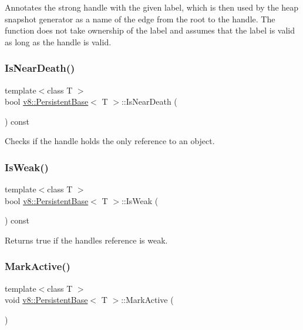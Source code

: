 Annotates the strong handle with the given label, which is then used by the heap snapshot generator as a name of the edge from the root to the handle. The function does not take ownership of the label and assumes that the label is valid as long as the handle is valid. \mbox{\label{classv8_1_1PersistentBase_a6587b66b7d4c0397129c51d0507b4094}} 
\subsubsection{\texorpdfstring{Is\+Near\+Death()}{IsNearDeath()}}
{\footnotesize\ttfamily template$<$class T $>$ \\
bool \mbox{\hyperlink{classv8_1_1PersistentBase}{v8\+::\+Persistent\+Base}}$<$ T $>$\+::Is\+Near\+Death (\begin{DoxyParamCaption}{ }\end{DoxyParamCaption}) const}

Checks if the handle holds the only reference to an object. \mbox{\label{classv8_1_1PersistentBase_a479c7b146da083aa608e133a7dec79f9}} 
\subsubsection{\texorpdfstring{Is\+Weak()}{IsWeak()}}
{\footnotesize\ttfamily template$<$class T $>$ \\
bool \mbox{\hyperlink{classv8_1_1PersistentBase}{v8\+::\+Persistent\+Base}}$<$ T $>$\+::Is\+Weak (\begin{DoxyParamCaption}{ }\end{DoxyParamCaption}) const}

Returns true if the handle\textquotesingle{}s reference is weak. \mbox{\label{classv8_1_1PersistentBase_a7244edd33a45b7d95e566fce85e3f87d}} 
\subsubsection{\texorpdfstring{Mark\+Active()}{MarkActive()}}
{\footnotesize\ttfamily template$<$class T $>$ \\
void \mbox{\hyperlink{classv8_1_1PersistentBase}{v8\+::\+Persistent\+Base}}$<$ T $>$\+::Mark\+Active (\begin{DoxyParamCaption}{ }\end{DoxyParamCaption})}

